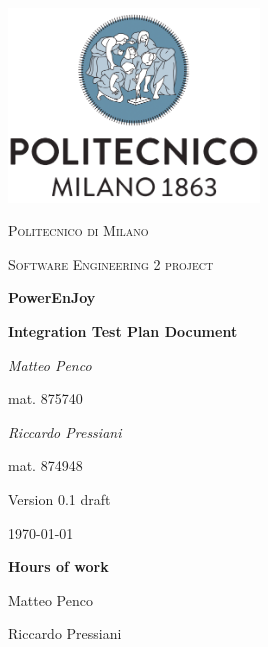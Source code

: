\documentclass{report}
\begin{document}
\begin{titlepage}
	\centering
	\includegraphics[width=0.5\textwidth]{polimi-logo}\par\vspace{1cm}
	{\scshape\LARGE Politecnico di Milano\par}
	\vspace{1cm}
	{\scshape\Large Software Engineering 2 project\par}
	\vspace{1.5cm}
	{\Huge\bfseries PowerEnJoy\par}
	\vspace{0.5cm}
	{\Large\bfseries Integration Test Plan Document\par}
	\vspace{2cm}
	\begin{multicols}{2}
		{\Large\itshape Matteo Penco\par}
		\vspace{0.25cm}
		mat. 875740
		\vfill\columnbreak
		{\Large\itshape Riccardo Pressiani\par}
		\vspace{0.25cm}
		mat. 874948
	\end{multicols}
	
	\vfill
	
	{\Large Version 0.1 draft\par}
	\vspace{1.25cm}
	{\large \today\par}
\end{titlepage}

\begin{versionhistory}
\end{versionhistory}
\vfill

{\noindent\Huge\bfseries Hours of work\par}
\vspace{0.5cm}
{\noindent Matteo Penco	\par}
{\noindent Riccardo Pressiani \par}
\vspace{4cm}

\tableofcontents







\listoffigures
\begingroup
\let\clearpage\relax
\listoftables
\endgroup



\end{document}
